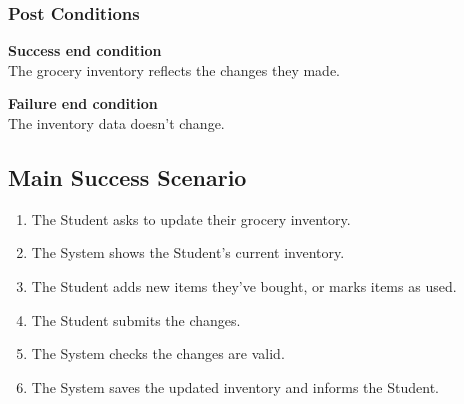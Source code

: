 \documentclass[10pt,letterpaper]{article}
\begin{document}
\subsubsection*{Post Conditions}

\textbf{Success end condition}\\
The grocery inventory reflects the changes they made.

\textbf{Failure end condition}\\
The inventory data doesn't change.

\subsection*{Main Success Scenario}
\begin{enumerate}
    \item The Student asks to update their grocery inventory.
    \item The System shows the Student's current inventory.
    \item The Student adds new items they've bought, or marks items as used.
    \item The Student submits the changes.
    \item The System checks the changes are valid.
    \item The System saves the updated inventory and informs the Student.
\end{enumerate}
\end{document}
